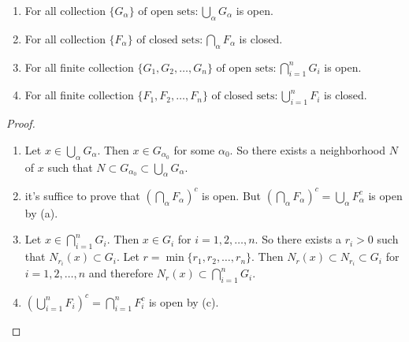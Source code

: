 \begin{theorem}
	\hfill
	\begin{enumerate}[label=(\alph*)]
		\item For all collection $\{G_{\alpha}\} \text{ of open sets}:\bigcup_{\alpha} G_{\alpha}$ is open.
		\item For all collection $\{F_{\alpha}\} \text{ of closed sets}:\bigcap_{\alpha} F_{\alpha}$ is closed.
		\item For all finite collection $\{G_{1},G_{2},\ldots,G_{n}\} \text{ of open sets}:\bigcap_{i=1}^{n} G_{i}$ is open.
		\item For all finite collection $\{F_{1},F_{2},\ldots,F_{n}\} \text{ of closed sets}:\bigcup_{i=1}^{n} F_{i}$ is closed.
	\end{enumerate}

	\begin{proof}
		\begin{enumerate}[label=(\alph*)]
			\item Let $x \in \bigcup_{\alpha}G_{\alpha}$. Then $x \in G_{\alpha_0}$ for some $\alpha_0$. So there exists a neighborhood $N$ of $x$ such that $N \subset G_{\alpha_0} \subset \bigcup_{\alpha}G_{\alpha}$.
			\item it's suffice to prove that $(\bigcap_{\alpha} F_{\alpha})^{c}$ is open. But $(\bigcap_{\alpha} F_{\alpha})^{c}=\bigcup_{\alpha} F_{\alpha}^{c}$ is open by (a).
			\item Let $x \in \bigcap_{i=1}^{n} G_{i}$. Then $x \in G_{i}$ for $i=1,2,\ldots,n$. So there exists a $r_i>0$ such that $N_{r_i}(x) \subset G_i$. Let $r=\min \{r_1,r_2,\ldots, r_n\}$. Then $N_r(x) \subset N_{r_i} \subset G_i$ for $i=1,2,\ldots,n$ and therefore $N_r(x) \subset \bigcap_{i=1}^{n} G_{i}$.
			\item  $(\bigcup_{i=1}^{n} F_{i})^{c}=\bigcap_{i=1}^{n} F_{i}^{c}$ is open by (c).
		\end{enumerate}
	\end{proof}
\end{theorem}


